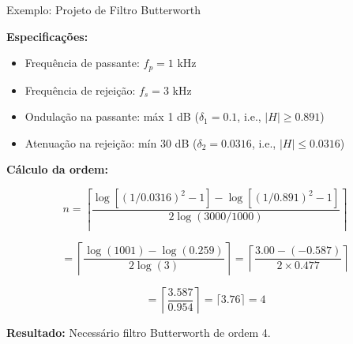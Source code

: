\begin{frame}{Exemplo: Projeto de Filtro Butterworth}

\textbf{Especificações:}

\begin{itemize}
\item Frequência de passante: $f_p = 1$ kHz
\item Frequência de rejeição: $f_s = 3$ kHz
\item Ondulação na passante: máx 1 dB ($\delta_1 = 0.1$, i.e., $|H| \geq 0.891$)
\item Atenuação na rejeição: mín 30 dB ($\delta_2 = 0.0316$, i.e., $|H| \leq 0.0316$)
\end{itemize}

\textbf{Cálculo da ordem:}

\[
n = \left\lceil \frac{\log[(1/0.0316)^2 - 1] - \log[(1/0.891)^2 - 1]}{2\log(3000/1000)} \right\rceil
\]

\[
= \left\lceil \frac{\log(1001) - \log(0.259)}{2\log(3)} \right\rceil = \left\lceil \frac{3.00 - (-0.587)}{2 \times 0.477} \right\rceil
\]

\[
= \left\lceil \frac{3.587}{0.954} \right\rceil = \lceil 3.76 \rceil = 4
\]

\textbf{Resultado:} Necessário filtro Butterworth de ordem 4.

\end{frame}


